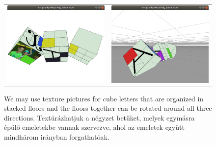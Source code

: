 \documentclass[a4paper]{article}
\begin{document}
\begin{figure}[h]
\begin{tabular}{ll}
\includegraphics[scale=.25, frame]{para9}
&
\includegraphics[scale=.25, frame]{para92}
\end{tabular}
\caption{We may use texture pictures for cube letters that are organized in stacked floors and the floors together can be rotated around all three directions. Textúrázhatjuk a négyzet betűket, melyek egymásra épülő emeletekbe vannak szervezve, ahol az emeletek együtt mindhárom irányban forgathatóak.}
\label{figpara9}
\end{figure}
\end{document}

